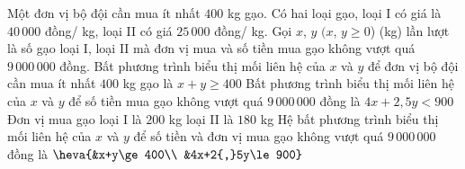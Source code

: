 \begin{ex}%
	Một đơn vị bộ đội cần mua ít nhất $400$ kg gạo. Có hai loại gạo, loại I có giá là $40\,000$ đồng/ kg, loại II có giá $25\,000$ đồng/ kg. Gọi $x$, $y$ $(x$, $y\ge 0$) (kg) lần lượt là số gạo loại I, loại II mà đơn vị mua và số tiền mua gạo không vượt quá $9\,000\,000$ đồng. 
	\choiceTF
	{\True Bất phương trình biểu thị mối liên hệ của $x$ và $y$ để đơn vị bộ đội cần mua ít nhất $400$ kg gạo là $x+y\ge 400$}
	{Bất phương trình biểu thị mối liên hệ của $x$ và $y$ để số tiền mua gạo không vượt quá $9\,000\,000$ đồng là $4x+2{,}5y<900$}
	{Đơn vị mua gạo loại I là $200$ kg loại II là $180$ kg}
	{\True Hệ bất phương trình biểu thị mối liên hệ của $x$ và $y$ để số tiền và đơn vị mua gạo không vượt quá $9\,000\,000$ đồng là $\heva{&x+y\ge 400\\ &4x+2{,}5y\le 900}$}
\end{ex}
